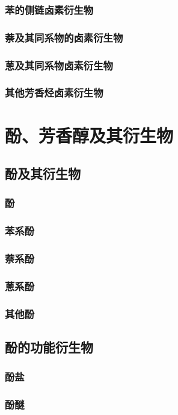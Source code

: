 \documentclass[UTF8]{../03-Chemistry}
\begin{document}
    \subsubsection{苯的侧链卤素衍生物}
    \subsubsection{萘及其同系物的卤素衍生物}
    \subsubsection{蒽及其同系物卤素衍生物}
    \subsubsection{其他芳香烃卤素衍生物}
\section{酚、芳香醇及其衍生物}
    \subsection{酚及其衍生物}
        \subsubsection{酚}
        \subsubsection{苯系酚}
        \subsubsection{萘系酚}
        \subsubsection{蒽系酚}
        \subsubsection{其他酚}
    \subsection{酚的功能衍生物}
        \subsubsection{酚盐}
        \subsubsection{酚醚}
\end{document}
